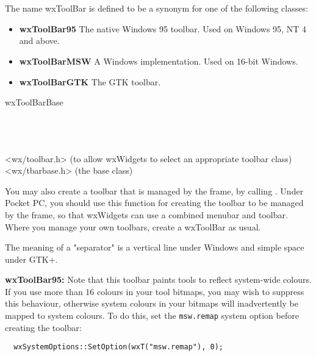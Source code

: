 \section{}\label{wxtoolbar}

The name wxToolBar is defined to be a synonym for one of the following classes:

\begin{itemize}\itemsep=0pt
\item {\bf wxToolBar95} The native Windows 95 toolbar. Used on Windows 95, NT 4 and above.
\item {\bf wxToolBarMSW} A Windows implementation. Used on 16-bit Windows.
\item {\bf wxToolBarGTK} The GTK toolbar.
\end{itemize}


wxToolBarBase\\
\\
\\
\\


<wx/toolbar.h> (to allow wxWidgets to select an appropriate toolbar class)\\
<wx/tbarbase.h> (the base class)


You may also create a toolbar that is managed by the frame, by
calling . Under Pocket PC,
you should  use this function for creating the toolbar
to be managed by the frame, so that wxWidgets can use a combined
menubar and toolbar. Where you manage your own toolbars, create a wxToolBar
as usual.

The meaning of a "separator" is a vertical line under Windows and simple space under GTK+.

{\bf wxToolBar95:} Note that this toolbar paints tools to reflect system-wide colours.
If you use more than 16 colours in your tool bitmaps, you may wish to suppress
this behaviour, otherwise system colours in your bitmaps will inadvertently be
mapped to system colours. To do this, set the {\tt msw.remap} system option
before creating the toolbar:

\begin{verbatim}
  wxSystemOptions::SetOption(wxT("msw.remap"), 0);
\end{verbatim}

